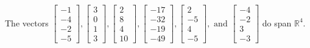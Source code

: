 \begin{exercise}
\begin{exerciseStatement}
  \end{exerciseStatement}
  \begin{exerciseAnswer}
   The vectors \(\left[\begin{array}{r}
-1 \\
-4 \\
-2 \\
-5
\end{array}\right] , \left[\begin{array}{r}
3 \\
0 \\
1 \\
3
\end{array}\right] , \left[\begin{array}{r}
2 \\
8 \\
4 \\
10
\end{array}\right] , \left[\begin{array}{r}
-17 \\
-32 \\
-19 \\
-49
\end{array}\right] , \left[\begin{array}{r}
2 \\
-5 \\
4 \\
-5
\end{array}\right] , \text{ and } \left[\begin{array}{r}
-4 \\
-2 \\
3 \\
-3
\end{array}\right]\) 
  	 do  
	span \(\mathbb{R}^4\).
  


  \end{exerciseAnswer}
\end{exercise}